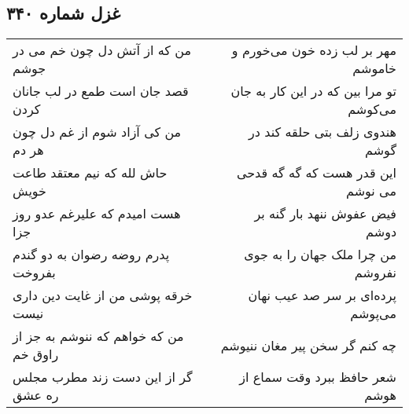 \begin{center}
\section*{غزل شماره ۳۴۰}
\label{sec:sh340}
\begin{longtable}{l p{0.5cm} r}
من که از آتش دل چون خم می در جوشم
&&
مهر بر لب زده خون می‌خورم و خاموشم
\\
قصد جان است طمع در لب جانان کردن
&&
تو مرا بین که در این کار به جان می‌کوشم
\\
من کی آزاد شوم از غم دل چون هر دم
&&
هندوی زلف بتی حلقه کند در گوشم
\\
حاش لله که نیم معتقد طاعت خویش
&&
این قدر هست که گه گه قدحی می نوشم
\\
هست امیدم که علیرغم عدو روز جزا
&&
فیض عفوش ننهد بار گنه بر دوشم
\\
پدرم روضه رضوان به دو گندم بفروخت
&&
من چرا ملک جهان را به جوی نفروشم
\\
خرقه پوشی من از غایت دین داری نیست
&&
پرده‌ای بر سر صد عیب نهان می‌پوشم
\\
من که خواهم که ننوشم به جز از راوق خم
&&
چه کنم گر سخن پیر مغان ننیوشم
\\
گر از این دست زند مطرب مجلس ره عشق
&&
شعر حافظ ببرد وقت سماع از هوشم
\\
\end{longtable}
\end{center}
